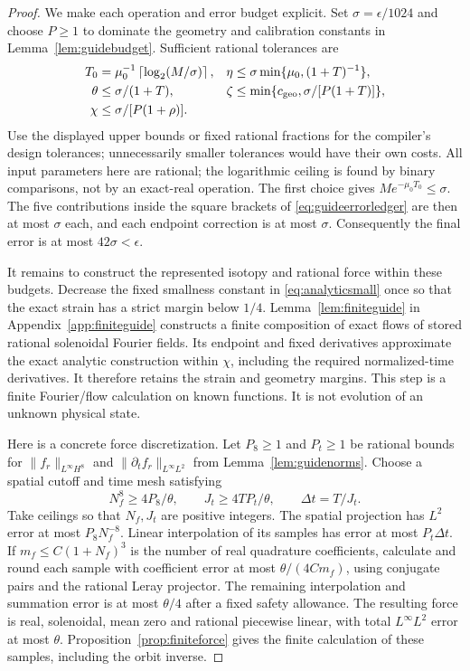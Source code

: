 \documentclass[11pt,a4paper]{amsart}
\theoremstyle{definition}
\theoremstyle{remark}
\numberwithin{equation}{section}
\newcommand{\norm}[1]{\lVert #1\rVert}
\begin{document}
\begin{proof}
We make each operation and error budget explicit. Set $\sigma=\epsilon/1024$ and choose $P\ge1$ to dominate the geometry and calibration constants in Lemma~\ref{lem:guidebudget}. Sufficient rational tolerances are
\begin{equation}\label{eq:guidechoices}
 \begin{aligned}
 T_0&=\mu_0^{-1}\left\lceil\log_2(M/\sigma)\right\rceil,&
 \eta&\le\sigma\min\{\mu_0,(1+T)^{-1}\},\\
 \theta&\le\sigma/(1+T),&
 \zeta&\le\min\{c_{\rm geo},\sigma/[P(1+T)]\},\\
 \chi&\le\sigma/[P(1+\rho)].
 \end{aligned}
\end{equation}
Use the displayed upper bounds or fixed rational fractions for the compiler's design tolerances; unnecessarily smaller tolerances would have their own costs. All input parameters here are rational; the logarithmic ceiling is found by binary comparisons, not by an exact-real operation. The first choice gives $Me^{-\mu_0T_0}\le\sigma$. The five contributions inside the square brackets of \eqref{eq:guideerrorledger} are then at most $\sigma$ each, and each endpoint correction is at most $\sigma$. Consequently the final error is at most $42\sigma<\epsilon$.

It remains to construct the represented isotopy and rational force within these budgets. Decrease the fixed smallness constant in \eqref{eq:analyticsmall} once so that the exact strain has a strict margin below $1/4$. Lemma~\ref{lem:finiteguide} in Appendix~\ref{app:finiteguide} constructs a finite composition of exact flows of stored rational solenoidal Fourier fields. Its endpoint and fixed derivatives approximate the exact analytic construction within $\chi$, including the required normalized-time derivatives. It therefore retains the strain and geometry margins. This step is a finite Fourier/flow calculation on known functions. It is not evolution of an unknown physical state.

Here is a concrete force discretization. Let $P_8\ge1$ and $P_t\ge1$ be rational bounds for $\norm{f_r}_{L^\infty H^8}$ and $\norm{\partial_tf_r}_{L^\infty L^2}$ from Lemma~\ref{lem:guidenorms}. Choose a spatial cutoff and time mesh satisfying
\begin{equation}\label{eq:forcegrid}
 N_f^8\ge4P_8/\theta,\qquad
 J_t\ge4TP_t/\theta,\qquad
 \Delta t=T/J_t.
\end{equation}
Take ceilings so that $N_f,J_t$ are positive integers. The spatial projection has $L^2$ error at most $P_8N_f^{-8}$. Linear interpolation of its samples has error at most $P_t\Delta t$. If $m_f\le C(1+N_f)^3$ is the number of real quadrature coefficients, calculate and round each sample with coefficient error at most $\theta/(4Cm_f)$, using conjugate pairs and the rational Leray projector. The remaining interpolation and summation error is at most $\theta/4$ after a fixed safety allowance. The resulting force is real, solenoidal, mean zero and rational piecewise linear, with total $L^\infty L^2$ error at most $\theta$. Proposition~\ref{prop:finiteforce} gives the finite calculation of these samples, including the orbit inverse.


\end{proof}
\end{document}
